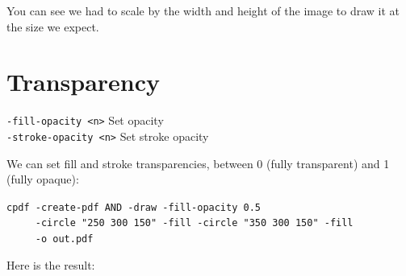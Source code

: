 \documentclass{book}
\begin{document}
\noindent You can see we had to scale by the width and height of the image to draw it at the size we expect.

\section{Transparency}
  {\small\begin{framed}
   \noindent\verb!-fill-opacity <n>! Set opacity\\
   \noindent\verb!-stroke-opacity <n>! Set stroke opacity
  \end{framed}}

We can set fill and stroke transparencies, between 0 (fully transparent) and 1 (fully opaque):

\begin{framed}
 \noindent\small\verb?cpdf -create-pdf AND -draw -fill-opacity 0.5?\\
 \noindent\small\verb?     -circle "250 300 150" -fill -circle "350 300 150" -fill?\\
 \noindent\small\verb?     -o out.pdf?
\end{framed}

\noindent Here is the result:
\end{document}
